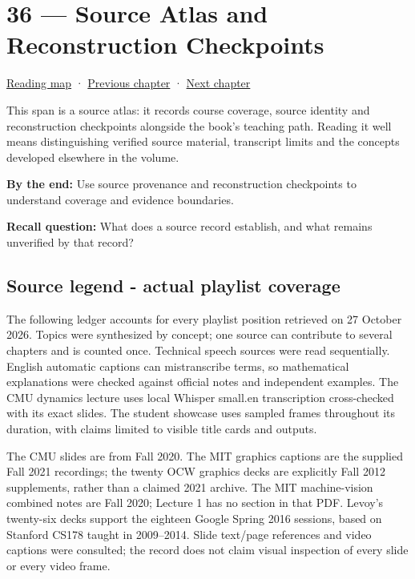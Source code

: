 \hypertarget{04-visual-computing-ii-ch036}{}
\chapter{36 --- Source Atlas and Reconstruction Checkpoints}\label{04-visual-computing-ii-ch036-source-atlas-and-reconstruction-checkpoints}

\hyperref[volume-reading-map]{Reading map} · \hyperref[04-visual-computing-ii-ch035-a-complete-renderer-as-an-executable-forward-model]{Previous chapter} · \hyperref[04-visual-computing-ii-ch037-gaussian-splatting-and-editable-captured-worlds]{Next chapter}

This span is a source atlas: it records course coverage, source identity and reconstruction checkpoints alongside the book's teaching path. Reading it well means distinguishing verified source material, transcript limits and the concepts developed elsewhere in the volume.

\textbf{By the end:} Use source provenance and reconstruction checkpoints to understand coverage and evidence boundaries.

\textbf{Recall question:} What does a source record establish, and what remains unverified by that record?

\section{Source legend - actual playlist coverage}\label{04-visual-computing-ii-ch036-source-legend---actual-playlist-coverage}

The following ledger accounts for every playlist position retrieved on 27 October 2026. Topics were synthesized by concept; one source can contribute to several chapters and is counted once. Technical speech sources were read sequentially. English automatic captions can mistranscribe terms, so mathematical explanations were checked against official notes and independent examples. The CMU dynamics lecture uses local Whisper small.en transcription cross-checked with its exact slides. The student showcase uses sampled frames throughout its duration, with claims limited to visible title cards and outputs.

The CMU slides are from Fall 2020. The MIT graphics captions are the supplied Fall 2021 recordings; the twenty OCW graphics decks are explicitly Fall 2012 supplements, rather than a claimed 2021 archive. The MIT machine-vision combined notes are Fall 2020; Lecture 1 has no section in that PDF. Levoy's twenty-six decks support the eighteen Google Spring 2016 sessions, based on Stanford CS178 taught in 2009--2014. Slide text/page references and video captions were consulted; the record does not claim visual inspection of every slide or every video frame.

